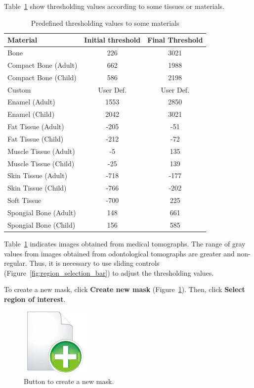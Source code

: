 Table~\ref{tab:limiar} show thresholding values according to some tissues or materials.

\begin{table}[h]
\centering
\caption{Predefined thresholding values to some materials}
\begin{tabular}{lcc}\\
\hline %
Material & Initial threshold & Final Threshold\\
\hline
\hline
Bone & 226 & 3021\\
Compact Bone (Adult) & 662 & 1988\\
Compact Bone (Child) & 586 & 2198\\
Custom & User Def. & User Def.\\
Enamel (Adult) & 1553 & 2850\\
Enamel (Child) & 2042 & 3021\\
Fat Tissue (Adult) & -205 & -51\\
Fat Tissue (Child) & -212 & -72\\
Muscle Tissue (Adult) & -5 & 135\\
Muscle Tissue (Child) & -25 & 139\\
Skin Tissue (Adult) & -718 & -177\\
Skin Tissue (Child) & -766 & -202\\
Soft Tissue & -700 & 225\\
Spongial Bone (Adult) & 148 & 661\\
Spongial Bone (Child) & 156 & 585\\
\hline
\end{tabular}
\label{tab:limiar}
\end{table}
\newpage

Table~\ref{tab:limiar} indicates images obtained from medical tomographs. The range of gray values from images obtained from odontological tomographs are greater and non-regular. Thus, it is necessary to use sliding controls (Figure~\ref{fig:region_selection_bar}) to adjust the thresholding values.

To create a new mask, click \textbf{Create new mask} (Figure~\ref{fig:shortcut_new_mask}). Then, click \textbf{Select region of interest}.

\begin{figure}[!htb]
\centering
\includegraphics[scale=0.2]{../user_guide_figures/icons/object_add_original.png}
\caption{Button to create a new mask.}
\label{fig:shortcut_new_mask}
\end{figure}

